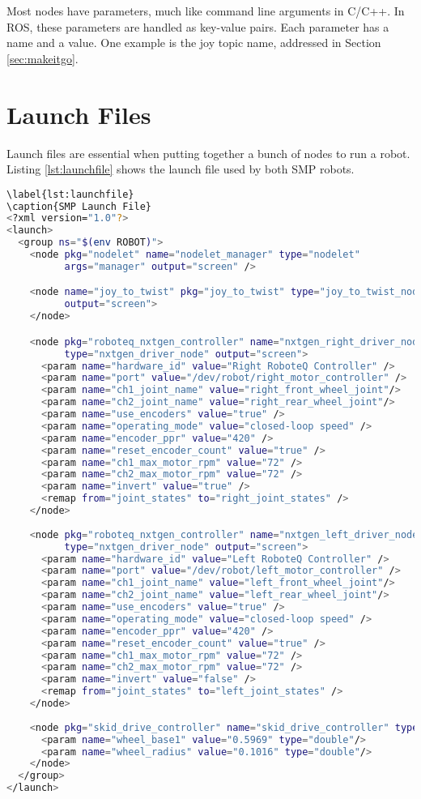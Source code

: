 Most nodes have parameters, much like command line arguments in C/C++. In ROS, these parameters are handled as key-value pairs. Each parameter has a name and a value. One example is the joy topic name, addressed in Section \ref{sec:makeitgo}.

\section{Launch Files}
\label{sec:launchfiles}

Launch files are essential when putting together a bunch of nodes to run a robot. Listing \ref{lst:launchfile} shows the launch file used by both SMP robots.

\begin{lstlisting}[language=bash]
\label{lst:launchfile}
\caption{SMP Launch File}
<?xml version="1.0"?>
<launch>
  <group ns="$(env ROBOT)">
    <node pkg="nodelet" name="nodelet_manager" type="nodelet"
          args="manager" output="screen" />

    <node name="joy_to_twist" pkg="joy_to_twist" type="joy_to_twist_node"
          output="screen">
    </node>

    <node pkg="roboteq_nxtgen_controller" name="nxtgen_right_driver_node"
          type="nxtgen_driver_node" output="screen">
      <param name="hardware_id" value="Right RoboteQ Controller" />
      <param name="port" value="/dev/robot/right_motor_controller" />
      <param name="ch1_joint_name" value="right_front_wheel_joint"/>
      <param name="ch2_joint_name" value="right_rear_wheel_joint"/>
      <param name="use_encoders" value="true" />
      <param name="operating_mode" value="closed-loop speed" />
      <param name="encoder_ppr" value="420" />
      <param name="reset_encoder_count" value="true" />
      <param name="ch1_max_motor_rpm" value="72" />
      <param name="ch2_max_motor_rpm" value="72" />
      <param name="invert" value="true" />
      <remap from="joint_states" to="right_joint_states" />
    </node>
 
    <node pkg="roboteq_nxtgen_controller" name="nxtgen_left_driver_node"
          type="nxtgen_driver_node" output="screen">
      <param name="hardware_id" value="Left RoboteQ Controller" />
      <param name="port" value="/dev/robot/left_motor_controller" />
      <param name="ch1_joint_name" value="left_front_wheel_joint"/>
      <param name="ch2_joint_name" value="left_rear_wheel_joint"/>
      <param name="use_encoders" value="true" />
      <param name="operating_mode" value="closed-loop speed" />
      <param name="encoder_ppr" value="420" />
      <param name="reset_encoder_count" value="true" />
      <param name="ch1_max_motor_rpm" value="72" />
      <param name="ch2_max_motor_rpm" value="72" />
      <param name="invert" value="false" />
      <remap from="joint_states" to="left_joint_states" />
    </node>
    
    <node pkg="skid_drive_controller" name="skid_drive_controller" type="base_controller_node" output="screen">
      <param name="wheel_base1" value="0.5969" type="double"/>
      <param name="wheel_radius" value="0.1016" type="double"/>
    </node>	
  </group>
</launch>
\end{lstlisting}

